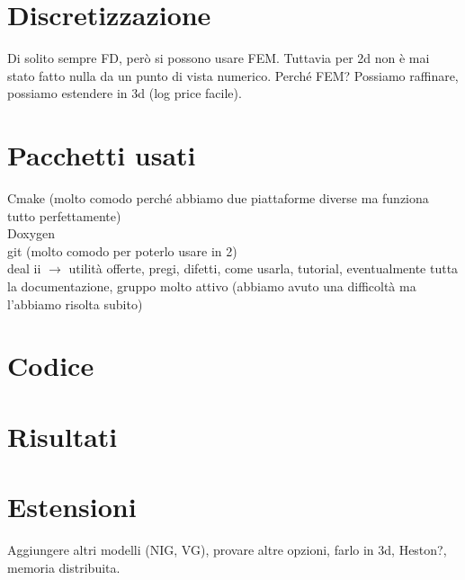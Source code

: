 \documentclass[a4paper,10pt]{report}
\theoremstyle{osservazione}
\theoremstyle{esempio}
\theoremstyle{notazione}
\theoremstyle{corollario}
\begin{document}
\chapter{Discretizzazione}
Di solito sempre FD, per\`o si possono usare FEM. Tuttavia per 2d non \`e mai stato fatto nulla da un punto di vista numerico. Perch\'e FEM? Possiamo raffinare, possiamo estendere in 3d (log price facile). 

\chapter{Pacchetti usati}
Cmake (molto comodo perch\'e abbiamo due piattaforme diverse ma funziona tutto perfettamente)\\Doxygen\\git (molto comodo per poterlo usare in 2)\\deal ii $\to$ utilit\`a offerte, pregi, difetti, come usarla, tutorial, eventualmente tutta la documentazione, gruppo molto attivo (abbiamo avuto una difficolt\`a ma l'abbiamo risolta subito)

\chapter{Codice}
\chapter{Risultati}
\chapter{Estensioni}
Aggiungere altri modelli (NIG, VG), provare altre opzioni, farlo in 3d, Heston?, memoria distribuita.
\end{document}
